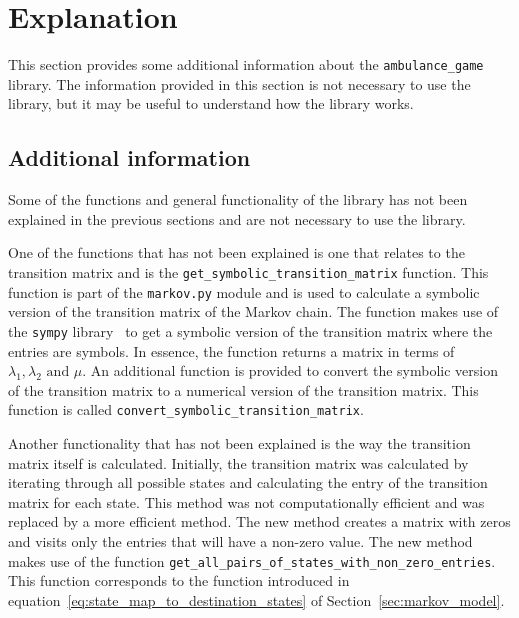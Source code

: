 \section{Explanation}\label{sec:ambulance_game_explanation}

This section provides some additional information about the
\texttt{ambulance\_game} library.
The information provided in this section is not necessary to use the library,
but it may be useful to understand how the library works.

\subsection{Additional information}

Some of the functions and general functionality of the library has not been
explained in the previous sections and are not necessary to use the library.

One of the functions that has not been explained is one that relates to the
transition matrix and is the \texttt{get\_symbolic\_transition\_matrix}
function.
This function is part of the \texttt{markov.py} module and is used to calculate
a symbolic version of the transition matrix of the Markov chain.
The function makes use of the \texttt{sympy} library~\cite{sympy} to get a
symbolic version of the transition matrix where the entries are symbols.
In essence, the function returns a matrix in terms of \(\lambda_1, \lambda_2
\text{ and } \mu\).
An additional function is provided to convert the symbolic version of the
transition matrix to a numerical version of the transition matrix.
This function is called \texttt{convert\_symbolic\_transition\_matrix}.

Another functionality that has not been explained is the way the transition
matrix itself is calculated.
Initially, the transition matrix was calculated by iterating through all
possible states and calculating the entry of the transition matrix for each
state.
This method was not computationally efficient and was replaced by a more
efficient method.
The new method creates a matrix with zeros and visits only the entries that
will have a non-zero value.
The new method makes use of the function
\texttt{get\_all\_pairs\_of\_states\_with\_non\_zero\_entries}.
This function corresponds to the function introduced in
equation~\eqref{eq:state_map_to_destination_states} of
Section~\ref{sec:markov_model}.

